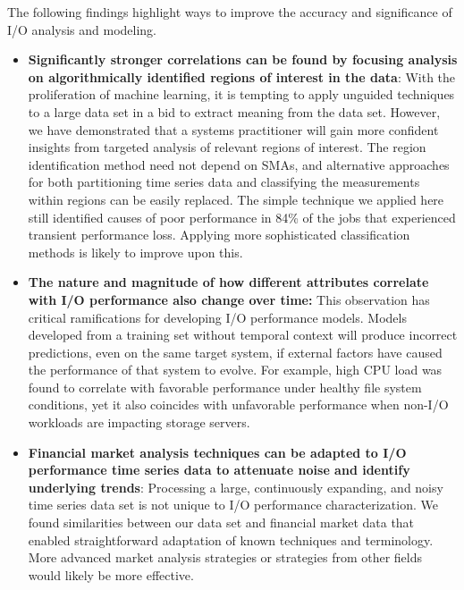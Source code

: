 The following findings highlight ways to improve the accuracy and significance of I/O analysis and modeling.

\begin{itemize}[leftmargin=*]

\item \textbf{Significantly stronger correlations can be found by focusing analysis on algorithmically identified regions of interest in the data}:
With the proliferation of machine learning, it is tempting to apply unguided techniques to a large data set in a bid to extract meaning from the data set.
However, we have demonstrated that a systems practitioner will gain more confident insights from targeted analysis of relevant regions of interest.
The region identification method need not depend on SMAs, and alternative approaches for both partitioning time series data and classifying the measurements within regions can be easily replaced.
The simple technique we applied here still identified causes of poor performance in 84\% of the jobs that experienced transient performance loss.
Applying more sophisticated classification methods is likely to improve upon this.


\item \textbf{The nature and magnitude of how different attributes correlate with I/O performance also change over time:}
This observation has critical ramifications for developing I/O performance models.
Models developed from a training set without temporal context will produce incorrect predictions, even on the same target system, if
external factors have caused the performance of that system to evolve.
For example, high CPU load was found to correlate with favorable performance under healthy file system conditions, yet it also coincides with unfavorable performance when non-I/O workloads are impacting storage servers.

\item \textbf{Financial market analysis techniques can be adapted to I/O performance time series data to attenuate noise and identify underlying trends}:
Processing a large, continuously expanding, and noisy time series data set is not unique to I/O performance characterization.
We found similarities between our data set and financial market data that enabled straightforward adaptation of known techniques and terminology.
More advanced market analysis strategies or strategies from other fields would likely be more effective.

\end{itemize}
